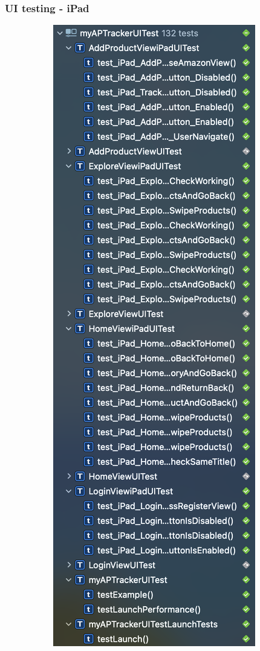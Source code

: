 \subsubsection{UI testing - iPad}
\begin{figure}[h!]
        \centering
        \begin{subfigure}[b]{0.3\textwidth}
        \centering
            \includegraphics[width=\textwidth]{images/testing/ui_testing_ipad_1.png}

\end{subfigure}
\end{figure}
